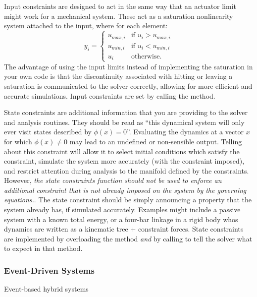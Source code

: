 Input constraints are designed to act in the same way that an actuator limit might work for a mechanical system.  These act as a saturation nonlinearity system attached to the input, where for each element: $$y_i = \begin{cases} u_{max,i} & \text{if } u_i > u_{max,i} \\ u_{min,i} & \text{if } u_i < u_{min,i} \\ u_i & \text{otherwise.}\end{cases}$$  The advantage of using the input limits instead of implementing the saturation in your own code is that the discontinuity associated with hitting or leaving a saturation is communicated to the solver correctly, allowing for more efficient and accurate simulations.  Input constraints are set by calling the  method.  

State constraints are additional information that you are providing to the solver and analysis routines.  They should be read as ``this dynamical system will only ever visit states described by $\phi(x)=0$''.  Evaluating the dynamics at a vector $x$ for which $\phi(x) \ne 0$ may lead to an undefined or non-sensible output.   Telling \robotlib about this constraint will allow it to select initial conditions which satisfy the constraint, simulate the system more accurately (with the constraint imposed), and restrict attention during analysis to the manifold defined by the constraints.  However, \emph{the state constraints function should not be used to enforce an additional constraint that is not already imposed on the system by the governing equations.}.  The state constraint should be simply announcing a property that the system already has, if simulated accurately.   Examples might include a passive system with a known total energy, or a four-bar linkage in a rigid body whos dynamics are written as a kinematic tree + constraint forces.   State constraints are implemented by overloading the  method \emph{and} by calling  to tell the solver what to expect in that method.  
 

\subsubsection{Event-Driven Systems}

Event-based hybrid systems


